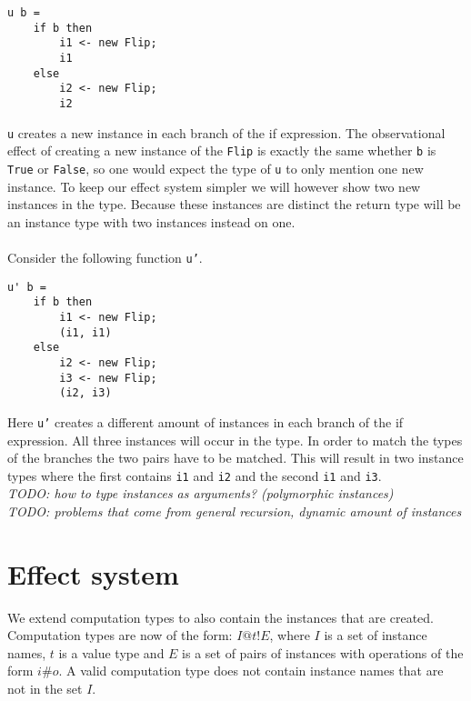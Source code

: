 \documentclass[12pt]{article}
\begin{document}
\begin{verbatim}
u b =
	if b then
		i1 <- new Flip;
		i1
	else
		i2 <- new Flip;
		i2
\end{verbatim}

\texttt{u} creates a new instance in each branch of the if expression.
The observational effect of creating a new instance of the \texttt{Flip} is exactly the same whether \texttt{b} is \texttt{True} or \texttt{False}, so one would expect the type of \texttt{u} to only mention one new instance. 
To keep our effect system simpler we will however show two new instances in the type.
Because these instances are distinct the return type will be an instance type with two instances instead on one.
\\\\
Consider the following function \texttt{u'}.

\begin{verbatim}
u' b =
	if b then
		i1 <- new Flip;
		(i1, i1)
	else
		i2 <- new Flip;
		i3 <- new Flip;
		(i2, i3)
\end{verbatim}

Here \texttt{u'} creates a different amount of instances in each branch of the if expression.
All three instances will occur in the type.
In order to match the types of the branches the two pairs have to be matched.
This will result in two instance types where the first contains \texttt{i1} and \texttt{i2} and the second \texttt{i1} and \texttt{i3}.\\

\noindent
\textit{TODO: how to type instances as arguments? (polymorphic instances)}\\
\textit{TODO: problems that come from general recursion, dynamic amount of instances}\\

\section{Effect system}

We extend computation types to also contain the instances that are created.\\
Computation types are now of the form: $I@t!E$, where $I$ is a set of instance names, $t$ is a value type and $E$ is a set of pairs of instances with operations of the form $i\#o$. A valid computation type does not contain instance names that are not in the set $I$.\\
\end{document}
